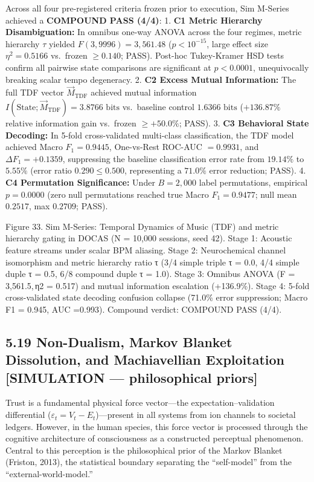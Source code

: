 \documentclass[
]{article}
\begin{document}
Across all four pre-registered criteria frozen prior to execution, Sim
M-Series achieved a \textbf{COMPOUND PASS (4/4)}: 1. \textbf{C1 Metric
Hierarchy Disambiguation:} In omnibus one-way ANOVA across the four
regimes, metric hierarchy \(\tau\) yielded \(F(3, 9996) = 3,561.48\)
(\(p < 10^{-15}\), large effect size \(\eta^2 = 0.5166\) vs.~frozen
\(\ge 0.140\); PASS). Post-hoc Tukey-Kramer HSD tests confirm all
pairwise state comparisons are significant at \(p < 0.0001\),
unequivocally breaking scalar tempo degeneracy. 2. \textbf{C2 Excess
Mutual Information:} The full TDF vector \(\vec{M}_{\text{TDF}}\)
achieved mutual information
\(I(\text{State}; \vec{M}_{\text{TDF}}) = 3.8766\text{ bits}\)
vs.~baseline control \(1.6366\text{ bits}\) (\(+136.87\%\) relative
information gain vs.~frozen \(\ge +50.0\%\); PASS). 3. \textbf{C3
Behavioral State Decoding:} In 5-fold cross-validated multi-class
classification, the TDF model achieved Macro \(F_1 = 0.9445\),
One-vs-Rest ROC-AUC \(= 0.9931\), and \(\Delta F_1 = +0.1359\),
suppressing the baseline classification error rate from \(19.14\%\) to
\(5.55\%\) (error ratio \(0.290 \le 0.500\), representing a \(71.0\%\)
error reduction; PASS). 4. \textbf{C4 Permutation Significance:} Under
\(B = 2,000\) label permutations, empirical \(p = 0.0000\) (zero null
permutations reached true Macro \(F_1 = 0.9477\); null mean \(0.2517\),
max \(0.2709\); PASS).

Figure 33. Sim M-Series: Temporal Dynamics of Music (TDF) and metric
hierarchy gating in DOCAS ({N = 10,000} sessions, seed 42). Stage 1:
Acoustic feature streams under scalar BPM aliasing. Stage 2:
Neurochemical channel isomorphism and metric hierarchy ratio {τ} ({3/4}
simple triple {τ = 0.0}, {4/4} simple duple {τ = 0.5}, {6/8} compound
duple {τ = 1.0}). Stage 3: Omnibus ANOVA ({F = 3,561.5, η2 = 0.517}) and
mutual information escalation ({+136.9\%}). Stage 4: 5-fold
cross-validated state decoding confusion collapse ({71.0\%} error
suppression; Macro {F1 = 0.945}, AUC {=0.993}). Compound verdict:
COMPOUND PASS (4/4).

\subsection{5.19 Non-Dualism, Markov Blanket Dissolution, and
Machiavellian Exploitation {[}SIMULATION --- philosophical
priors{]}}\label{non-dualism-markov-blanket-dissolution-and-machiavellian-exploitation-simulation-philosophical-priors}

Trust is a fundamental physical force vector---the
expectation--validation differential
(\(\varepsilon_t = V_t - E_t\))---present in all systems from ion
channels to societal ledgers. However, in the human species, this force
vector is processed through the cognitive architecture of consciousness
as a constructed perceptual phenomenon. Central to this perception is
the philosophical prior of the Markov Blanket (Friston, 2013), the
statistical boundary separating the ``self-model'' from the
``external-world-model.''
\end{document}
